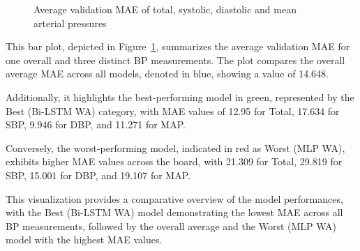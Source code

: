\begin{figure}[h]
    \centering
    \captionsetup{format=plain, justification=centering, font=small}
    \caption{Average validation MAE of total, systolic, diastolic and mean arterial pressures}
    \label{fig:all_mae}
\end{figure}

This bar plot, depicted in Figure~\ref{fig:all_mae}, summarizes the average validation MAE for one overall and three distinct BP measurements.
The plot compares the overall average MAE across all models, denoted in blue, showing a value of 14.648.

Additionally, it highlights the best-performing model in green, represented by the Best (Bi-LSTM WA) category, with MAE values of 12.95 for Total, 17.634 for SBP, 9.946 for DBP, and 11.271 for MAP\@.

Conversely, the worst-performing model, indicated in red as Worst (MLP WA), exhibits higher MAE values across the board, with 21.309 for Total, 29.819 for SBP, 15.001 for DBP, and 19.107 for MAP\@.

This visualization provides a comparative overview of the model performances, with the Best (Bi-LSTM WA) model demonstrating the lowest MAE across all BP measurements,
followed by the overall average and the Worst (MLP WA) model with the highest MAE values.

